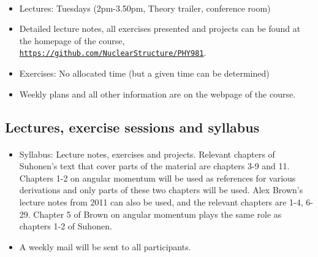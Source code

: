 \documentclass[%
oneside,                 %
final,                   %
10pt]{article}
\begin{document}
\paragraph{}
\begin{itemize}
\item Lectures: Tuesdays (2pm-3.50pm, Theory trailer, conference room)

\item Detailed lecture notes, all exercises presented and projects can be found at the homepage of the course, \href{{https://github.com/NuclearStructure/PHY981}}{\nolinkurl{https://github.com/NuclearStructure/PHY981}}.

\item Exercises: No allocated time (but a given time can be determined)

\item Weekly plans and all other information are on the webpage of the course.
\end{itemize}

\noindent




\subsection*{Lectures, exercise sessions and syllabus}

\paragraph{}
\begin{itemize}
\item Syllabus: Lecture notes, exercises and projects. Relevant chapters of Suhonen's text that cover parts of the material are chapters 3-9 and 11. Chapters 1-2 on angular momentum will be used as references for various derivations and only parts of these two chapters will be used. Alex Brown's lecture notes from 2011 can also be used, and the relevant chapters are 1-4, 6-29. Chapter 5 of Brown on angular momentum plays the same role as chapters 1-2 of Suhonen. 

\item A weekly mail will be sent to all participants. 
\end{itemize}

\noindent




\end{document}
